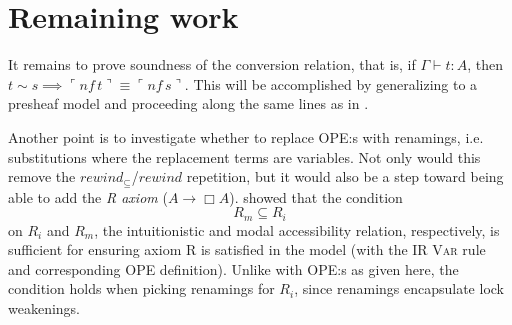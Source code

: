\documentclass{article}
\begin{document}
\section{Remaining work}

It remains to prove soundness of the conversion relation,
that is, if $\Gamma \vdash t : A$,
then $t \sim s \implies \ulcorner \textit{nf} \, t \urcorner \equiv \ulcorner \textit{nf} \, s \urcorner$.
This will be accomplished by generalizing to a presheaf model
and proceeding along the same lines as in \cite{altenkirch95}.

Another point is to investigate whether to replace OPE:s with renamings,
i.e. substitutions where the replacement terms are variables.
Not only would this remove
the $\textit{rewind}_\subseteq$/$\textit{rewind}$ repetition,
but it would also be a step toward being able to add the \emph{R axiom}
($A \rightarrow \Box A$).
\textcite{valliappan-r} showed that the condition
$$ R_m \subseteq R_i $$
on $R_i$ and $R_m$,
the intuitionistic and modal accessibility relation, respectively,
is sufficient for ensuring axiom R is satisfied in the model
(with the IR \textsc{Var} rule and corresponding OPE definition).
Unlike with OPE:s as given here,
the condition holds when picking renamings for $R_i$,
since renamings encapsulate lock weakenings.

\printbibliography
\end{document}
